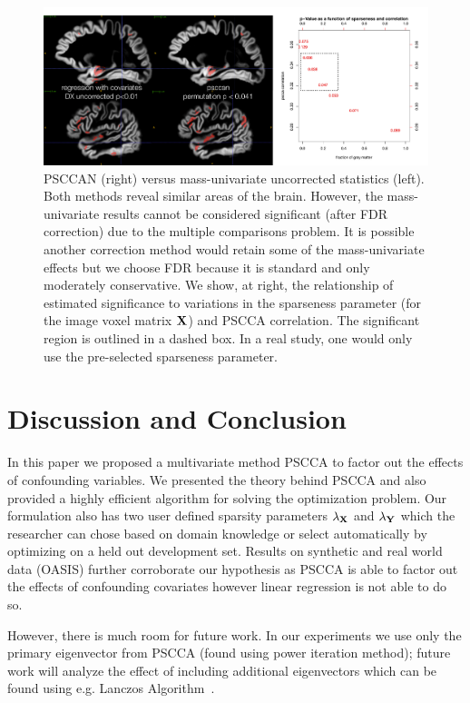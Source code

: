 \documentclass{llncs}
\newcommand{\X}{{\bf X}}
\newcommand{\Y}{{\bf Y}}
\begin{document}
\begin{figure}
\label{fig:comp}
\begin{center}
\includegraphics[width=120mm]{MUvPSCCAN.pdf} 
\end{center}
\caption{PSCCAN (right) versus mass-univariate uncorrected statistics
(left).  Both methods reveal similar areas of the brain.  However, the
mass-univariate results cannot be considered significant (after FDR
correction) due to the multiple comparisons problem.  It is possible
another correction method would retain some of the mass-univariate
effects but we choose FDR because it is standard and only moderately
conservative.  We show, at right, the relationship of estimated
significance to variations in the sparseness parameter (for the image
voxel matrix $\X$) and PSCCA correlation.  The significant region is
outlined in a dashed box.  In a real study, one would only use the
pre-selected sparseness parameter.}
\end{figure}


\section{Discussion and Conclusion}
In this paper we proposed a multivariate method PSCCA to factor out the effects of confounding variables.
We presented the theory behind PSCCA and also provided a highly efficient algorithm for solving the optimization problem. Our formulation also has two user defined sparsity parameters $\lambda_{\X}$ and $\lambda_{\Y}$ which the researcher can chose based on domain knowledge or select automatically by optimizing on a held out development set. Results on synthetic and real world data (OASIS) further corroborate our hypothesis as PSCCA is able to factor out the effects of confounding covariates however linear regression is not able to do so.

However, there is much room for future work. In our experiments we use only the primary eigenvector from PSCCA (found using power iteration method); future work will analyze the effect of including additional eigenvectors which can be found using e.g. Lanczos Algorithm~\cite{golub}.
\end{document}

